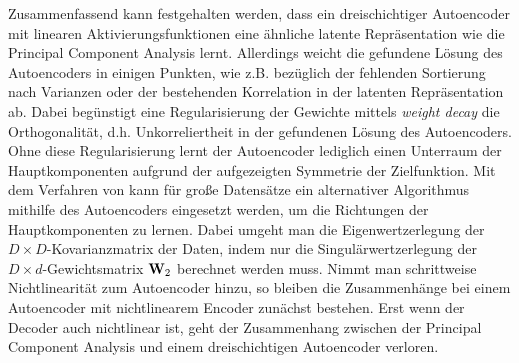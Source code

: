 Zusammenfassend kann festgehalten werden, dass ein dreischichtiger Autoencoder mit linearen
Aktivierungsfunktionen eine ähnliche latente Repräsentation wie die Principal Component Analysis
lernt. Allerdings weicht die gefundene Lösung des Autoencoders in einigen Punkten, wie z.B.
bezüglich der fehlenden Sortierung nach Varianzen oder der bestehenden Korrelation in der latenten
Repräsentation ab. Dabei begünstigt eine Regularisierung der Gewichte mittels \textit{weight decay}
die Orthogonalität, d.h. Unkorreliertheit in der gefundenen Lösung des Autoencoders. Ohne diese
Regularisierung lernt der Autoencoder lediglich einen Unterraum der Hauptkomponenten aufgrund der
aufgezeigten Symmetrie der Zielfunktion. Mit dem Verfahren von \textcite{Plaut.2018} kann für große
Datensätze ein alternativer Algorithmus mithilfe des Autoencoders eingesetzt werden, um die
Richtungen der Hauptkomponenten zu lernen. Dabei umgeht man die Eigenwertzerlegung der $D \times
	D$-Kovarianzmatrix der Daten, indem nur die Singulärwertzerlegung der $D \times d$-Gewichtsmatrix
$\mathbf{W}_2$ berechnet werden muss. Nimmt man schrittweise Nichtlinearität zum Autoencoder hinzu, so
bleiben die Zusammenhänge bei einem Autoencoder mit nichtlinearem Encoder zunächst bestehen. Erst
wenn der Decoder auch nichtlinear ist, geht der Zusammenhang zwischen der Principal Component
Analysis und einem dreischichtigen Autoencoder verloren.